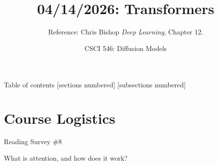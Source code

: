 \documentclass[10pt]{beamer}
\title{04/14/2026: Transformers}
\author{Reference: Chris Bishop \textit{Deep Learning}, Chapter 12.}
\date{CSCI 546: Diffusion Models}
\begin{document}
\maketitle


\begin{frame}{Table of contents}
  [sections numbered]
  [subsections numbered]
  \tableofcontents
\end{frame}





\section{Course Logistics}



%
%
%	


\begin{frame}{Reading Survey \#8}

What is attention, and how does it work?

	
\end{frame}



%
%
\end{document}
